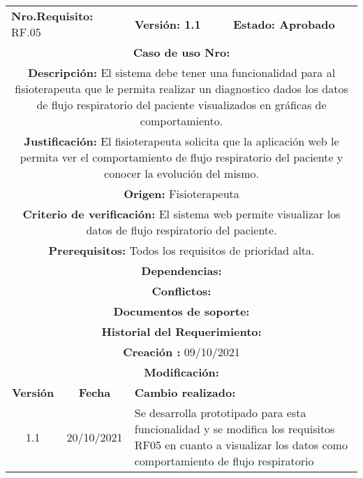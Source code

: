 \begin{center}
        

\begin{tabular}{|c|c|p{4cm}|p{4cm}|}
            \hline
            \rowcolor{red} \multicolumn{4}{|c|}{\textbf{Prioridad:} Alta}  \\
            \hline
            \multicolumn{2}{|l}{\textbf{Nro.Requisito: }RF.05} & \multicolumn{1}{|l}{\textbf{Versión: 1.1}} & \multicolumn{1}{|l|}{\textbf{Estado: Aprobado}} \\
            \multicolumn{4}{|p{13cm}|}{\textbf{Caso de uso Nro: }}  \\
            \hline
            \multicolumn{4}{|p{13cm}|}{\textbf{Descripción: } El sistema debe tener una funcionalidad para al fisioterapeuta que le permita realizar un diagnostico dados los datos de flujo respiratorio del paciente visualizados en gráficas de comportamiento. } \\
            \multicolumn{4}{|p{13cm}|}{\textbf{Justificación: } El fisioterapeuta solicita que la aplicación web le permita ver el comportamiento de flujo respiratorio del paciente y conocer la evolución del mismo.} \\ 
            \multicolumn{4}{|p{13cm}|}{\textbf{Origen: }Fisioterapeuta}  \\
            \multicolumn{4}{|p{13cm}|}{\textbf{Criterio de verificación: } El sistema web permite visualizar los datos de flujo respiratorio del paciente.  } \\
            \hline
            \multicolumn{4}{|p{13cm}|}{\textbf{Prerequisitos: } Todos los requisitos de prioridad alta. }\\
            \hline \multicolumn{4}{|p{12cm}|}{\textbf{Dependencias: }
                }  \\
            \multicolumn{4}{|p{12cm}|}{\textbf{Conflictos: }}  \\
            \hline
            \multicolumn{4}{|p{12cm}|}{\textbf{Documentos de soporte: }}  \\
            \hline
            \multicolumn{4}{|p{12cm}|}{\textbf{Historial del Requerimiento: }}  \\
            \multicolumn{4}{|p{12cm}|}{\textbf{Creación : }09/10/2021}  \\
            \multicolumn{4}{|p{12cm}|}{\textbf{Modificación: }}  \\
             \textbf{Versión} & \textbf{Fecha} & \multicolumn{2}{p{8cm}|}{\textbf{Cambio realizado:}} \\
            \hline
               1.1    &20/10/2021 &   \multicolumn{2}{p{8cm}|}{Se desarrolla prototipado para esta funcionalidad y  se modifica los requisitos RF05 en cuanto a visualizar los datos como comportamiento de flujo respiratorio}
              \\
            \hline
\end{tabular}


\end{center}
